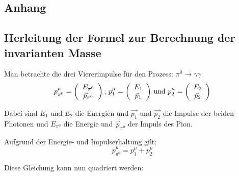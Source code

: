 \documentclass[a4paper,11pt,oneside,final,german,openbib,pdftex]{scrbook}
\begin{document}
{%

\begin{appendix}
\chapter{Anhang}
\section{Herleitung der Formel zur Berechnung der invarianten Masse}
\label{sec:Herleitung-der-Formel-zur-Berechnung-der-invarianten-Masse}

Man betrachte die drei Viererimpulse f\"ur den Prozess: $\pi^0\rightarrow \gamma\gamma $
\begin{equation}
p_{\pi^0}^{\mu}=\left(\begin{array}{c}E_{\pi^0}\\\vec{p}_{\pi^0}\end{array}\right) \textnormal{,}\,\,
p_{1}^{\mu}=\left(\begin{array}{c}E_{1}\\\vec{p}_{1}\end{array}\right) \,\textnormal{und}\,\, p_{2}^{\mu}=\left(\begin{array}{c}E_{2}\\\vec{p}_{2}\end{array}\right)
\end{equation}

Dabei sind $E_{1}$ und $E_{2}$ die Energien und $\vec{p_{1}}$ und $\vec{p_{2}}$ die Impulse der beiden Photonen und $E_{\pi^0}$ die Energie und $\vec{p}_{\pi^0}$ der Impuls des Pion.

Aufgrund der Energie- und Impulserhaltung gilt:
\begin{equation}
p^{\mu}_{\pi^0} = p^{\mu}_1 + p^{\mu}_2
\end{equation}

Diese Gleichung kann nun quadriert werden:


\end{appendix}}
\end{document}
